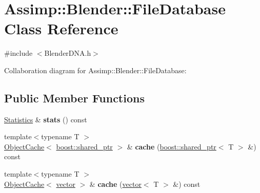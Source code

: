 \hypertarget{class_assimp_1_1_blender_1_1_file_database}{\section{Assimp\+:\+:Blender\+:\+:File\+Database Class Reference}
\label{class_assimp_1_1_blender_1_1_file_database}
}


{\ttfamily \#include $<$Blender\+D\+N\+A.\+h$>$}



Collaboration diagram for Assimp\+:\+:Blender\+:\+:File\+Database\+:
\subsection*{Public Member Functions}
\begin{DoxyCompactItemize}
\item 
\hypertarget{class_assimp_1_1_blender_1_1_file_database_a6937c18f3ad82f65e946ec55344f0661}{\hyperlink{class_assimp_1_1_blender_1_1_statistics}{Statistics} \& {\bfseries stats} () const }\label{class_assimp_1_1_blender_1_1_file_database_a6937c18f3ad82f65e946ec55344f0661}

\item 
\hypertarget{class_assimp_1_1_blender_1_1_file_database_ac22a18a786ef4a5cac1e5b99a6f12b3d}{{\footnotesize template$<$typename T $>$ }\\\hyperlink{singleton_assimp_1_1_blender_1_1_object_cache}{Object\+Cache}$<$ \hyperlink{classboost_1_1shared__ptr}{boost\+::shared\+\_\+ptr} $>$ \& {\bfseries cache} (\hyperlink{classboost_1_1shared__ptr}{boost\+::shared\+\_\+ptr}$<$ T $>$ \&) const }\label{class_assimp_1_1_blender_1_1_file_database_ac22a18a786ef4a5cac1e5b99a6f12b3d}

\item 
\hypertarget{class_assimp_1_1_blender_1_1_file_database_a458d4614adeee5f4ecb609d73281c7b5}{{\footnotesize template$<$typename T $>$ }\\\hyperlink{singleton_assimp_1_1_blender_1_1_object_cache}{Object\+Cache}$<$ \hyperlink{class_assimp_1_1_blender_1_1vector}{vector} $>$ \& {\bfseries cache} (\hyperlink{class_assimp_1_1_blender_1_1vector}{vector}$<$ T $>$ \&) const }\label{class_assimp_1_1_blender_1_1_file_database_a458d4614adeee5f4ecb609d73281c7b5}

\end{DoxyCompactItemize}
